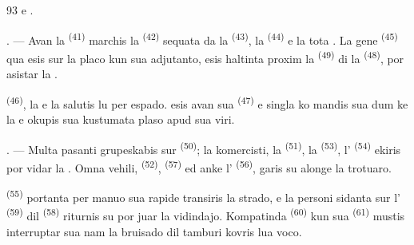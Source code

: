 \begin{VUpage}[95]{93}
\VUcontinue
{} e .

\VUsaut{3.0mm}

. --- Avan la  \textsuperscript{(41)} marchis la \cc
{} \textsuperscript{(42)} sequata da la  \textsuperscript{(43)}, la\nl
{} \textsuperscript{(44)} e la tota . La gene\cc
{} \textsuperscript{(45)} qua esis sur la placo kun sua adjutanto,\nl
esis haltinta proxim la  \textsuperscript{(49)} di la\nl
{} \textsuperscript{(48)}, por asistar la .

\VUblancAlinea
{} \textsuperscript{(46)}, la  e la \cc
{} salutis lu per espado.  esis\nl
avan sua  \textsuperscript{(47)} e singla  ko\cc
mandis sua  dum ke la \nl
{} e  okupis sua kustumata\nl
plaso apud sua viri.

. --- Multa pasanti grupeskabis sur \nl
{} \textsuperscript{(50)}; la komercisti, la \cc
{} \textsuperscript{(51)}, la  \textsuperscript{(53)}, l' \textsuperscript{(54)} ekiris por\nl
vidar la . Omna vehili,  \textsuperscript{(52)}, \cc
{} \textsuperscript{(57)} ed anke l' \textsuperscript{(56)}, garis\nl
su alonge la trotuaro.

\VUsaut{3.0mm}

\VUblancAlinea
{} \textsuperscript{(55)} portanta per manuo\nl
sua  rapide transiris la strado,\nl
e la personi sidanta sur l' \textsuperscript{(59)} dil \cc
{} \textsuperscript{(58)} riturnis su por juar la vidindajo.\nl
Kompatinda  \textsuperscript{(60)} kun sua \cc
{} \textsuperscript{(61)} mustis interruptar sua \nl
nam la bruisado dil tamburi kovris lua voco.


\end{VUpage}
